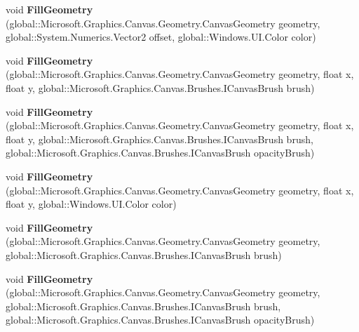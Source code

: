 \begin{DoxyCompactItemize}
void {\bfseries Fill\+Geometry} (global\+::\+Microsoft.\+Graphics.\+Canvas.\+Geometry.\+Canvas\+Geometry geometry, global\+::\+System.\+Numerics.\+Vector2 offset, global\+::\+Windows.\+U\+I.\+Color color)
\item 
\mbox{\label{class_microsoft_1_1_graphics_1_1_canvas_1_1_canvas_drawing_session_a1d3d1094412613a53a5ef240d57701f0}} 
void {\bfseries Fill\+Geometry} (global\+::\+Microsoft.\+Graphics.\+Canvas.\+Geometry.\+Canvas\+Geometry geometry, float x, float y, global\+::\+Microsoft.\+Graphics.\+Canvas.\+Brushes.\+I\+Canvas\+Brush brush)
\item 
\mbox{\label{class_microsoft_1_1_graphics_1_1_canvas_1_1_canvas_drawing_session_abc70f39b3a78c8e70caa372c554fce31}} 
void {\bfseries Fill\+Geometry} (global\+::\+Microsoft.\+Graphics.\+Canvas.\+Geometry.\+Canvas\+Geometry geometry, float x, float y, global\+::\+Microsoft.\+Graphics.\+Canvas.\+Brushes.\+I\+Canvas\+Brush brush, global\+::\+Microsoft.\+Graphics.\+Canvas.\+Brushes.\+I\+Canvas\+Brush opacity\+Brush)
\item 
\mbox{\label{class_microsoft_1_1_graphics_1_1_canvas_1_1_canvas_drawing_session_a91e2f4442ed0c330f3dd797c3fd4cf52}} 
void {\bfseries Fill\+Geometry} (global\+::\+Microsoft.\+Graphics.\+Canvas.\+Geometry.\+Canvas\+Geometry geometry, float x, float y, global\+::\+Windows.\+U\+I.\+Color color)
\item 
\mbox{\label{class_microsoft_1_1_graphics_1_1_canvas_1_1_canvas_drawing_session_a2974139306e2c32e4199065c8186fe79}} 
void {\bfseries Fill\+Geometry} (global\+::\+Microsoft.\+Graphics.\+Canvas.\+Geometry.\+Canvas\+Geometry geometry, global\+::\+Microsoft.\+Graphics.\+Canvas.\+Brushes.\+I\+Canvas\+Brush brush)
\item 
\mbox{\label{class_microsoft_1_1_graphics_1_1_canvas_1_1_canvas_drawing_session_a7541b81c9df77b3a48d7da7c544c5eae}} 
void {\bfseries Fill\+Geometry} (global\+::\+Microsoft.\+Graphics.\+Canvas.\+Geometry.\+Canvas\+Geometry geometry, global\+::\+Microsoft.\+Graphics.\+Canvas.\+Brushes.\+I\+Canvas\+Brush brush, global\+::\+Microsoft.\+Graphics.\+Canvas.\+Brushes.\+I\+Canvas\+Brush opacity\+Brush)

\end{DoxyCompactItemize}
